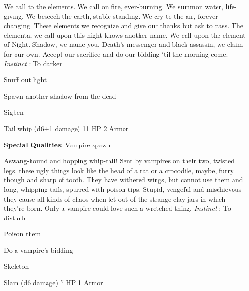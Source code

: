 \startMonsterDescription
We call to the elements.  We call on fire, ever-burning.  We summon water, life-giving.  We beseech the earth, stable-standing.  We cry to the air, forever-changing.  These elements we recognize and give our thanks but ask to pass.  The elemental we call upon this night knows another name.  We call upon the element of Night.  Shadow, we name you.  Death’s messenger and black assassin, we claim for our own.  Accept our sacrifice and do our bidding ‘til the morning come. {\em Instinct} : To darken
\stopMonsterDescription
       
\startitemize[1,packed]
         
\item Snuff out light

         
\item Spawn another shadow from the dead

       
\stopitemize
       
\startMonsterName
Sigben	 
\stopMonsterName
       

Tail whip (d6+1 damage)	11 HP	2 Armor

       


       
\startMonsterQualities
         {\bf Special Qualities:}  Vampire spawn
\stopMonsterQualities
       
\startMonsterDescription
Aswang-hound and hopping whip-tail!  Sent by vampires on their two, twisted legs, these ugly things look like the head of a rat or a crocodile, maybe, furry though and sharp of tooth.  They have withered wings, but cannot use them and long, whipping tails, spurred with poison tips.  Stupid, vengeful and mischievous they cause all kinds of chaos when let out of the strange clay jars in which they’re born.  Only a vampire could love such a wretched thing. {\em Instinct} : To disturb
\stopMonsterDescription
       
\startitemize[1,packed]
         
\item Poison them

         
\item Do a vampire's bidding

       
\stopitemize
       
\startMonsterName
Skeleton	 
\stopMonsterName
       

Slam (d6 damage)	7 HP	1 Armor

       

